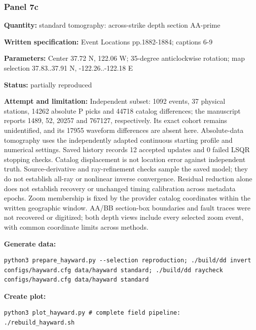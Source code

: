 \subsubsection*{Panel 7c}
\noindent\textbf{Quantity:} standard tomography: across-strike depth section AA-prime\par
\noindent\textbf{Written specification:} Event Locations pp.1882-1884; captions 6-9\par
\noindent\textbf{Parameters:} Center 37.72 N, 122.06 W; 35-degree anticlockwise rotation; map selection 37.83..37.91 N, -122.26..-122.18 E\par
\noindent\textbf{Status:} partially reproduced\par
\noindent\textbf{Attempt and limitation:} Independent subset: 1092 events, 37 physical stations, 14262 absolute P picks and 44718 catalog differences; the manuscript reports 1489, 52, 20257 and 767127, respectively. Its exact cohort remains unidentified, and its 17955 waveform differences are absent here. Absolute-data tomography uses the independently adapted continuous starting profile and numerical settings. Saved history records 12 accepted updates and 0 failed LSQR stopping checks. Catalog displacement is not location error against independent truth. Source-derivative and ray-refinement checks sample the saved model; they do not establish all-ray or nonlinear inverse convergence. Residual reduction alone does not establish recovery or unchanged timing calibration across metadata epochs. Zoom membership is fixed by the provider catalog coordinates within the written geographic window. AA/BB section-box boundaries and fault traces were not recovered or digitized; both depth views include every selected zoom event, with common coordinate limits across methods.\par
\noindent\textbf{Generate data:}
\begin{lstlisting}
python3 prepare_hayward.py --selection reproduction; ./build/dd invert configs/hayward.cfg data/hayward standard; ./build/dd raycheck configs/hayward.cfg data/hayward standard
\end{lstlisting}
\noindent\textbf{Create plot:}
\begin{lstlisting}
python3 plot_hayward.py # complete field pipeline: ./rebuild_hayward.sh
\end{lstlisting}
